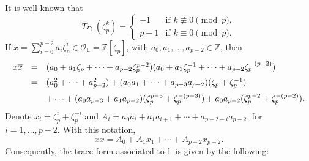 \documentclass[10pt,a4paper]{amsart}
\begin{document}
It is well-known that $$Tr_{\mathbb{L}}(\zeta_p^k)=\begin{cases} -1 & \textrm{if } k\not\equiv 0 \pmod p,\\ p-1 & \textrm{if } k\equiv 0\pmod p. \end{cases}$$ If $x=\displaystyle \sum_{i=0}^{p-2}a_i\zeta_p^i\in\mathcal{O}_\mathbb{L}=\mathbb{Z}[\zeta_p]$, with $a_0,a_1,\ldots,a_{p-2}\in\mathbb{Z}$, then
\[  \begin{array}{lll} x\overline{x} &=& (a_0+a_1\zeta_p+\cdots+a_{p-2}\zeta_p^{p-2})(a_0+a_1\zeta_p^{-1}+\cdots+a_{p-2}\zeta_p^{-(p-2)})\vspace{.2cm} \\ &=&(a_0^2+\cdots +a_{p-2}^2)+(a_0a_1+\cdots +a_{p-3}a_{p-2})(\zeta_p+\zeta_p^{-1})\vspace{.2cm}\\ && \displaystyle +\cdots + (a_0a_{p-3}+a_1a_{p-2})(\zeta_p^{p-3}+\zeta_p^{-(p-3)})+a_0a_{p-2}(\zeta_p^{p-2}+\zeta_p^{-(p-2)}).\end{array} \]
Denote $x_i=\zeta_p^{i}+\zeta_p^{-i}$ and $A_i=a_0a_i+a_1a_{i+1}+\cdots +a_{p-2-i}a_{p-2}$, for $i=1,\ldots,p-2$. With this notation, \begin{equation} \label{expxxbarra} x\overline{x}=A_0+A_1x_1+\cdots +A_{p-2}x_{p-2}. \end{equation}
Consequently, the trace form associated to $\mathbb{L}$ is given by the following:
\end{document}
